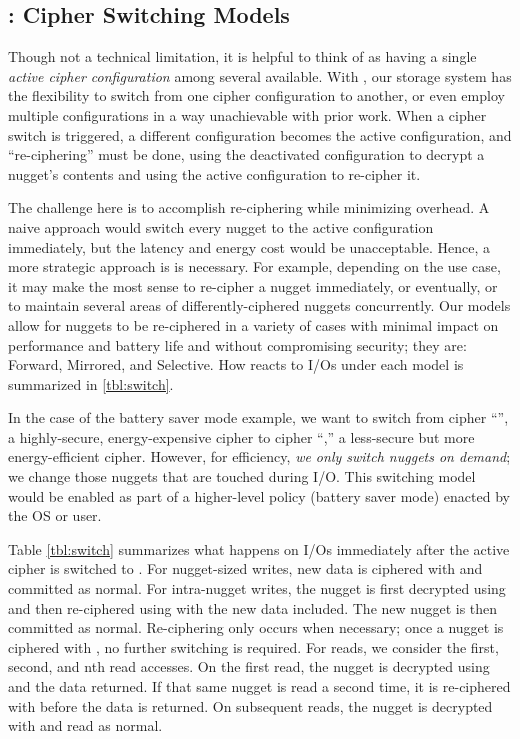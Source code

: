\subsection{\sysA: Cipher Switching Models}\label{subsec:des-switch}

Though not a technical limitation, it is helpful to think of \sys as having a
single {\em active cipher configuration} among several available. With \sysA,
our storage system has the flexibility to switch from one cipher configuration
to another, or even employ multiple configurations in a way unachievable with
prior work. When a cipher switch is triggered, a different configuration becomes
the active configuration, and ``re-ciphering'' must be done, \ie using the
deactivated configuration to decrypt a nugget's contents and using the active
configuration to re-cipher it.

The challenge here is to accomplish re-ciphering while minimizing overhead. A
naive approach would switch every nugget to the active configuration
immediately, but the latency and energy cost would be unacceptable. Hence, a
more strategic approach is is necessary. For example, depending on the use case,
it may make the most sense to re-cipher a nugget immediately, or eventually, or
to maintain several areas of differently-ciphered nuggets concurrently. Our
models allow for nuggets to be re-ciphered in a variety of cases with minimal
impact on performance and battery life and without compromising security; they
are: Forward, Mirrored, and Selective. How \sys reacts to I/Os under each model
is summarized in \cref{tbl:switch}.




 In the case of the battery saver mode
example, we want to switch from cipher ``\cone'', a highly-secure,
energy-expensive cipher to cipher ``\ctwo,'' a less-secure but more
energy-efficient cipher. However, for efficiency, {\em we only switch
nuggets on demand}; \ie we change those nuggets that are touched
during I/O. This switching model would be enabled as part of a
higher-level policy (\ie battery saver mode) enacted by the OS or
user.

Table \cref{tbl:switch} summarizes what happens on I/Os immediately after the
active cipher is switched to \ctwo. For nugget-sized writes, new data is
ciphered with \ctwo and committed as normal. For intra-nugget writes, the nugget
is first decrypted using \cone and then re-ciphered using \ctwo with the new
data included. The new nugget is then committed as normal. Re-ciphering only
occurs when necessary; once a nugget is ciphered with \ctwo, no further
switching is required. For reads, we consider the first, second, and nth read
accesses. On the first read, the nugget is decrypted using \cone and the data
returned. If that same nugget is read a second time, it is re-ciphered with
\ctwo before the data is returned. On subsequent reads, the nugget is decrypted
with \ctwo and read as normal.


